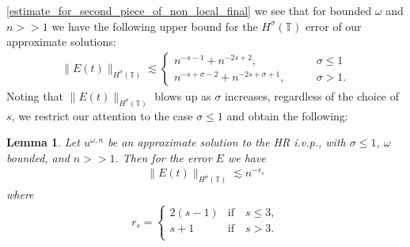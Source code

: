 \documentclass[12pt,reqno]{amsart}
\newcommand{\ci}{\mathbb{T}}
\theoremstyle{plain}  %
\newtheorem{lemma}{Lemma}
\theoremstyle{definition}
\begin{document}
	\eqref{estimate_for_second_piece_of_non_local_final} we see that for bounded $\omega$ and $n >> 1$
	we have the following upper bound for the $H^\sigma(\ci)$ error
	of our approximate solutions:
	\begin{equation*}
		\begin{split}
			\|E(t)\|_{H^{\sigma}(\ci)} \lesssim 
			  \begin{cases}
				  n^{-s-1} + n^{-2s +2}, \qquad & \sigma \le 1
				  \\
				  n^{-s + \sigma - 2} + n^{-2s + \sigma + 1}, \qquad &
				  \sigma > 1.
			  \end{cases}
		\end{split}
	\end{equation*}
		Noting that $\|E(t)\|_{H^\sigma(\ci)}$ blows up as $\sigma$ 
		increases,
	regardless of the choice of $s$, we restrict our attention to the case $\sigma \le 1$
	and obtain the following:
	  \begin{lemma}
		  \label{lem:error_of_approx_solution}
		  Let $u^{\omega,n}$ be an approximate solution to the HR i.v.p., 
		  with $\sigma \le 1$,  $\omega$ bounded, and $n >> 1$.
		  Then for the error $E$ we have
		  \begin{equation}
			  \begin{split}
				  \|E(t)\|_{H^\sigma(\ci)} \lesssim n^{-r_s}
				  \label{total-error-approx-solution}
			  \end{split}
		  \end{equation}
		  where
		  \begin{equation}
			  \begin{split}
			r_s = 
			\begin{cases}
				2(s-1)   & \text{if} \quad s \le 3,\\  
				s+1  & \text{if} \quad s > 3. \\
			\end{cases}
			\label{r_s-definition}
			  \end{split}
		  \end{equation}
	  \end{lemma}
	 
	 
	 
	 
	 
	 
	 
	 
\end{document}
